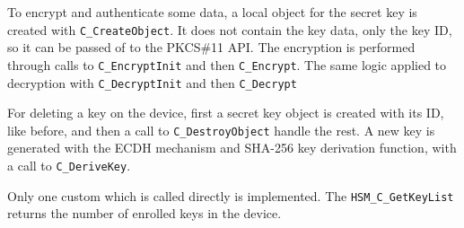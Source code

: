 To encrypt and authenticate some data, a local object for the secret key is created with \texttt{C\_CreateObject}. It does not contain the key data, only the key ID, so it can be passed of to the PKCS\#11 API. The encryption is performed through calls to \texttt{C\_EncryptInit} and then \texttt{C\_Encrypt}.
The same logic applied to decryption with \texttt{C\_DecryptInit} and then \texttt{C\_Decrypt}

For deleting a key on the device, first a secret key object is created with its ID, like before, and then a call to \texttt{C\_DestroyObject} handle the rest.
A new key is generated with the ECDH mechanism and \ac{SHA}-256 key derivation function, with a call to \texttt{C\_DeriveKey}.

Only one custom which is called directly is implemented. The \texttt{HSM\_C\_GetKeyList} returns the number of enrolled keys in the device.
